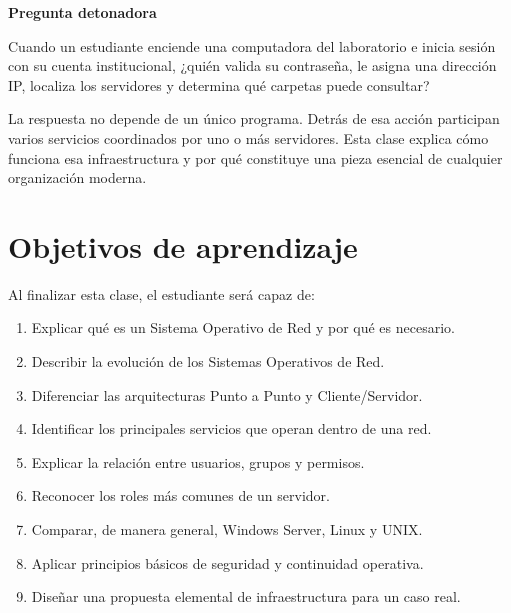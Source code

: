 \documentclass[
  spanish,
  letterpaper,
]{scrbook}
\providecommand{\tightlist}{%
  \setlength{\itemsep}{0pt}\setlength{\parskip}{0pt}}
\begin{document}
\begin{tcolorbox}[enhanced jigsaw, arc=.35mm, bottomrule=.15mm, breakable, colback=white, colframe=quarto-callout-note-color-frame, left=2mm, leftrule=.75mm, opacityback=0, rightrule=.15mm, toprule=.15mm]
\begin{minipage}[t]{5.5mm}
\textcolor{quarto-callout-note-color}{\faInfo}
\end{minipage}%
\begin{minipage}[t]{\textwidth - 5.5mm}

\vspace{-3mm}\textbf{Pregunta detonadora}\vspace{3mm}

Cuando un estudiante enciende una computadora del laboratorio e inicia
sesión con su cuenta institucional, ¿quién valida su contraseña, le
asigna una dirección IP, localiza los servidores y determina qué
carpetas puede consultar?

\end{minipage}%
\end{tcolorbox}

La respuesta no depende de un único programa. Detrás de esa acción
participan varios servicios coordinados por uno o más servidores. Esta
clase explica cómo funciona esa infraestructura y por qué constituye una
pieza esencial de cualquier organización moderna.


\chapter{Objetivos de aprendizaje}\label{objetivos-de-aprendizaje-2}

Al finalizar esta clase, el estudiante será capaz de:

\begin{enumerate}
\def\labelenumi{\arabic{enumi}.}
\tightlist
\item
  Explicar qué es un Sistema Operativo de Red y por qué es necesario.
\item
  Describir la evolución de los Sistemas Operativos de Red.
\item
  Diferenciar las arquitecturas Punto a Punto y Cliente/Servidor.
\item
  Identificar los principales servicios que operan dentro de una red.
\item
  Explicar la relación entre usuarios, grupos y permisos.
\item
  Reconocer los roles más comunes de un servidor.
\item
  Comparar, de manera general, Windows Server, Linux y UNIX.
\item
  Aplicar principios básicos de seguridad y continuidad operativa.
\item
  Diseñar una propuesta elemental de infraestructura para un caso real.
\end{enumerate}
\end{document}
